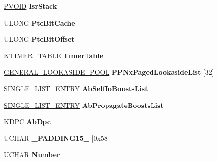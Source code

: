 \begin{DoxyCompactItemize}
\hyperlink{interfacevoid}{P\+V\+O\+ID} {\bfseries Isr\+Stack}
\item 
\mbox{\label{struct___k_p_r_c_b_a141db7531dbae5518c07800688d4c50e}} 
U\+L\+O\+NG {\bfseries Pte\+Bit\+Cache}
\item 
\mbox{\label{struct___k_p_r_c_b_aaeecf3426cfb304ea90c4e29e1a7c8df}} 
U\+L\+O\+NG {\bfseries Pte\+Bit\+Offset}
\item 
\mbox{\label{struct___k_p_r_c_b_a8c11ae9c039916bbe4539115fcde4681}} 
\hyperlink{struct___k_t_i_m_e_r___t_a_b_l_e}{K\+T\+I\+M\+E\+R\+\_\+\+T\+A\+B\+LE} {\bfseries Timer\+Table}
\item 
\mbox{\label{struct___k_p_r_c_b_a4f948f1dbdb87d25adda1847632e2666}} 
\hyperlink{struct___g_e_n_e_r_a_l___l_o_o_k_a_s_i_d_e___p_o_o_l}{G\+E\+N\+E\+R\+A\+L\+\_\+\+L\+O\+O\+K\+A\+S\+I\+D\+E\+\_\+\+P\+O\+OL} {\bfseries P\+P\+Nx\+Paged\+Lookaside\+List} \mbox{[}32\mbox{]}
\item 
\mbox{\label{struct___k_p_r_c_b_a759bc93aeaf6a799b485b67885a8bab5}} 
\hyperlink{struct___s_i_n_g_l_e___l_i_s_t___e_n_t_r_y}{S\+I\+N\+G\+L\+E\+\_\+\+L\+I\+S\+T\+\_\+\+E\+N\+T\+RY} {\bfseries Ab\+Self\+Io\+Boosts\+List}
\item 
\mbox{\label{struct___k_p_r_c_b_ae02635ba3955a507d820fdfef90bd863}} 
\hyperlink{struct___s_i_n_g_l_e___l_i_s_t___e_n_t_r_y}{S\+I\+N\+G\+L\+E\+\_\+\+L\+I\+S\+T\+\_\+\+E\+N\+T\+RY} {\bfseries Ab\+Propagate\+Boosts\+List}
\item 
\mbox{\label{struct___k_p_r_c_b_abd65e24782c14663e086fb6b7c6ce506}} 
\hyperlink{struct___k_d_p_c}{K\+D\+PC} {\bfseries Ab\+Dpc}
\item 
\mbox{\label{struct___k_p_r_c_b_a265cfdc7e029dbc4ed7bf84ef2d4346f}} 
U\+C\+H\+AR {\bfseries \+\_\+\+P\+A\+D\+D\+I\+N\+G15\+\_\+} \mbox{[}0x58\mbox{]}
\item 
\mbox{\label{struct___k_p_r_c_b_aadc1c5ccf153f678106367032be551ed}} 
U\+C\+H\+AR {\bfseries Number}
\item 

\end{DoxyCompactItemize}
